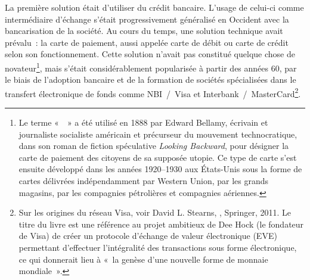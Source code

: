La première solution était d'utiliser du crédit bancaire. L'usage de celui-ci comme intermédiaire d'échange s'était progressivement généralisé en Occident avec la bancarisation de la société. Au cours du temps, une solution technique avait prévalu~: la carte de paiement, aussi appelée carte de débit ou carte de crédit selon son fonctionnement. Cette solution n'avait pas constitué quelque chose de novateur\footnote{Le terme «~~» a été utilisé en 1888 par Edward Bellamy, écrivain et journaliste socialiste américain et précurseur du mouvement technocratique, dans son roman de fiction spéculative \emph{Looking Backward}, pour désigner la carte de paiement des citoyens de sa supposée utopie. Ce type de carte s'est ensuite développé dans les années 1920--1930 aux États-Unis sous la forme de cartes délivrées indépendamment par Western Union, par les grands magasins, par les compagnies pétrolières et compagnies aériennes.}, mais s'était considérablement popularisée à partir des années 60, par le biais de l'adoption bancaire et de la formation de sociétés spécialisées dans le transfert électronique de fonds comme NBI~/~Visa et Interbank~/~MasterCard\footnote{Sur les origines du réseau Visa, voir David L. Stearns, , Springer, 2011. Le titre du livre est une référence au projet ambitieux de Dee Hock (le fondateur de Visa) de créer un protocole d'échange de valeur électronique (EVE) permettant d'effectuer l'intégralité des transactions sous forme électronique, ce qui donnerait lieu à «~la genèse d'une nouvelle forme de monnaie mondiale~».}. %


